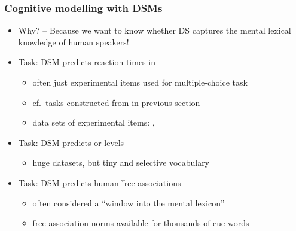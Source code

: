 \documentclass[t]{beamer} %
\begin{document}
\begin{frame}
  \frametitle{Cognitive modelling with DSMs}

  \begin{itemize}
  \item \h{Why?} -- Because we want to know whether DS captures the mental lexical knowledge of human speakers!
    \gap
  \item<2-> Task: DSM predicts reaction times in  \citep{Hare:etc:09,Lapesa:Evert:13}
    \begin{itemize}
    \item often just experimental items used for multiple-choice task \citep[e.g.][]{Pado:Lapata:07,Herdagdelen:Erk:Baroni:09}
    \item cf.\ tasks constructed from  in previous section
    \item data sets of experimental items: , 
    \end{itemize}
  \item<3-> Task: DSM predicts  \citep{Murphy:Baroni:Poesio:09} or  levels \citep{Mitchell:etc:08}
    \begin{itemize}
    \item huge datasets, but tiny and selective vocabulary
    \end{itemize}
  \item<4-> Task: DSM predicts human \h{free associations}
    \begin{itemize}
    \item often considered a ``window into the mental lexicon''
    \item free association norms available for thousands of cue words
    \end{itemize}
  \end{itemize}
\end{frame}
\end{document}
